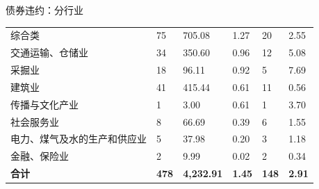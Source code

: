 \begin{frame}{债券违约：分行业}
\begin{table}[]
{\begin{tabular}{llllll}
				综合类                            & 75                                        & 705.08                                          & 1.27                                        & 20                                          & 2.55                                                \\
				交通运输、仓储业                  & 34                                        & 350.60                                          & 0.96                                        & 12                                          & 5.08                                                \\
				采掘业                            & 18                                        & 96.11                                           & 0.92                                        & 5                                           & 7.69                                                \\
				建筑业                            & 41                                        & 415.44                                          & 0.61                                        & 11                                          & 0.56                                                \\
				传播与文化产业                    & 1                                         & 3.00                                            & 0.61                                        & 1                                           & 3.70                                                \\
				社会服务业                        & 8                                         & 66.69                                           & 0.39                                        & 6                                           & 1.55                                                \\
				电力、煤气及水的生产和供应业      & 5                                         & 37.98                                           & 0.20                                        & 3                                           & 1.18                                                \\
				金融、保险业                      & 2                                         & 9.99                                            & 0.02                                        & 2                                           & 0.34                                                \\
				\textbf{合计}                     & \textbf{478}                              & \textbf{4,232.91}                               & \textbf{1.45}                               & \textbf{148}                                & \textbf{2.91}                                       \\ \hline

\end{tabular}}
\end{table}
\end{frame}
